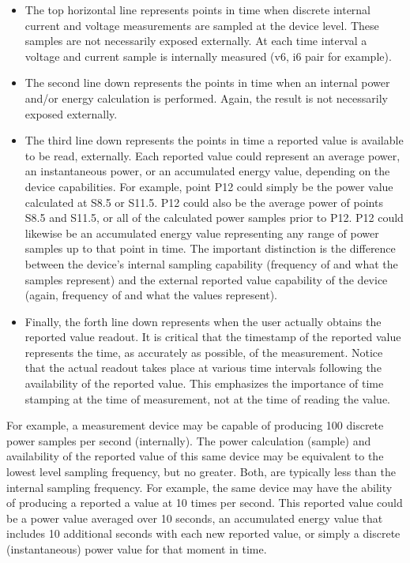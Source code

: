 \begin{itemize}
\item
The top horizontal line represents points in time when discrete internal current and voltage measurements are sampled at the device level. These samples are not necessarily exposed externally. At each time interval a voltage and current sample is internally measured (v6, i6 pair for example).  
\item
The second line down represents the points in time when an internal power and/or energy calculation is performed. Again, the result is not necessarily exposed externally.
\item
The third line down represents the points in time a reported value is available to be read, externally. Each reported value could represent an average power, an instantaneous power, or an accumulated energy value, depending on the device capabilities. For example, point P12 could simply be the power value calculated at S8.5 or S11.5. P12 could also be the average power of points S8.5 and S11.5, or all of the calculated power samples prior to P12. P12 could likewise be an accumulated energy value representing any range of power samples up to that point in time. The important distinction is the difference between the device’s internal sampling capability (frequency of and what the samples represent) and the external reported value capability of the device (again, frequency of and what the values represent).
\item
Finally, the forth line down represents when the user actually obtains the reported value readout. It is critical that the timestamp of the reported value represents the time, as accurately as possible, of the measurement. Notice that the actual readout takes place at various time intervals following the availability of the reported value. This emphasizes the importance of time stamping at the time of measurement, not at the time of reading the value.
\end{itemize}

For example, a measurement device may be capable of producing 100 discrete power samples per second (internally). The power calculation (sample) and availability of the reported value of this same device may be equivalent to the lowest level sampling frequency, but no greater. Both, are typically less than the internal sampling frequency. For example, the same device may have the ability of producing a reported a value at 10 times per second. This reported value could be a power value averaged over 10 seconds, an accumulated energy value that includes 10 additional seconds with each new reported value, or simply a discrete (instantaneous) power value for that moment in time. 


